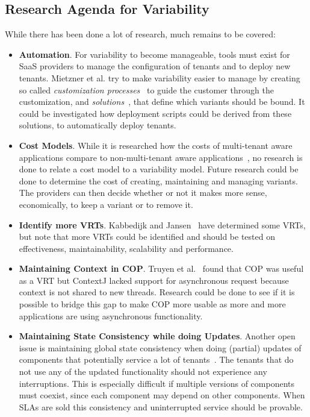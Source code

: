 \subsection{Research Agenda for Variability}\label{sec:var_agenda}
While there has been done a lot of research, much remains to be covered:
\begin{itemize}

\item \textbf{Automation}.
For variability to become manageable, tools must exist for \ac{SaaS} providers to manage the configuration of tenants and to deploy new tenants. Mietzner et al. try to make variability easier to manage by creating so called \textit{customization processes}~\cite{mietzner2008generation} to guide the customer through the customization, and \textit{solutions}~\cite{mietzner2008defining}, that define which variants should be bound. It could be investigated how deployment scripts could be derived from these solutions, to automatically deploy tenants.

\item \textbf{Cost Models}.
While it is researched how the costs of multi-tenant aware applications compare to non-multi-tenant aware applications~\cite{mietzner2009variability}, no research is done to relate a cost model to a variability model. Future research could be done to determine the cost of creating, maintaining and managing variants. The providers can then decide whether or not it makes more sense, economically, to keep a variant or to remove it.

\item \textbf{Identify more \aclp{VRT}}. 
Kabbedijk and Jansen~\cite{kabbedijk2011variability} have determined some \acp{VRT}, but note that more \acp{VRT} could be identified and should be tested on effectiveness, maintainability, scalability and performance.

\item \textbf{Maintaining Context in \ac{COP}}. 
Truyen et al.~\cite{truyen2012context} found that \ac{COP} was useful as a \ac{VRT} but ContextJ lacked support for asynchronous request because context is not shared to new threads. Research could be done to see if it is possible to bridge this gap to make \ac{COP} more usable as more and more applications are using asynchronous functionality.

\item \textbf{Maintaining State Consistency while doing Updates}.
Another open issue is maintaining global state consistency when doing (partial) updates of components that potentially service a lot of tenants~\cite{truyen2012context,dumitracs2009upgrades}. The tenants that do not use any of the updated functionality should not experience any interruptions. This is especially difficult if multiple versions of components must coexist, since each component may depend on other components. When \acp{SLA} are sold this consistency and uninterrupted service should be provable.

\end{itemize}
